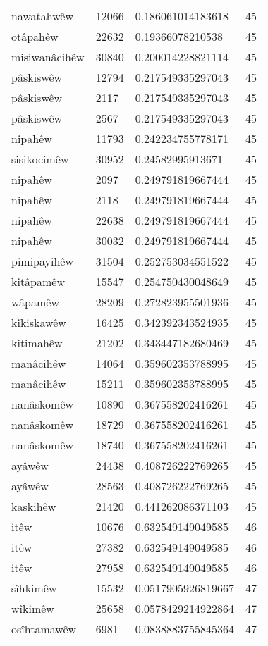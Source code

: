 \begin{longtable}{llll}
nawatahwêw & 12066 & 0.186061014183618 & 45\\
otâpahêw & 22632 & 0.19366078210538 & 45\\
misiwanâcihêw & 30840 & 0.200014228821114 & 45\\
pâskiswêw & 12794 & 0.217549335297043 & 45\\
pâskiswêw & 2117 & 0.217549335297043 & 45\\
pâskiswêw & 2567 & 0.217549335297043 & 45\\
nipahêw & 11793 & 0.242234755778171 & 45\\
sisikocimêw & 30952 & 0.24582995913671 & 45\\
nipahêw & 2097 & 0.249791819667444 & 45\\
nipahêw & 2118 & 0.249791819667444 & 45\\
nipahêw & 22638 & 0.249791819667444 & 45\\
nipahêw & 30032 & 0.249791819667444 & 45\\
pimipayihêw & 31504 & 0.252753034551522 & 45\\
kitâpamêw & 15547 & 0.254750430048649 & 45\\
wâpamêw & 28209 & 0.272823955501936 & 45\\
kikiskawêw & 16425 & 0.342392343524935 & 45\\
kitimahêw & 21202 & 0.343447182680469 & 45\\
manâcihêw & 14064 & 0.359602353788995 & 45\\
manâcihêw & 15211 & 0.359602353788995 & 45\\
nanâskomêw & 10890 & 0.367558202416261 & 45\\
nanâskomêw & 18729 & 0.367558202416261 & 45\\
nanâskomêw & 18740 & 0.367558202416261 & 45\\
ayâwêw & 24438 & 0.408726222769265 & 45\\
ayâwêw & 28563 & 0.408726222769265 & 45\\
kaskihêw & 21420 & 0.441262086371103 & 45\\
itêw & 10676 & 0.632549149049585 & 46\\
itêw & 27382 & 0.632549149049585 & 46\\
itêw & 27958 & 0.632549149049585 & 46\\
sîhkimêw & 15532 & 0.0517905926819667 & 47\\
wîkimêw & 25658 & 0.0578429214922864 & 47\\
osîhtamawêw & 6981 & 0.0838883755845364 & 47\\

\end{longtable}
